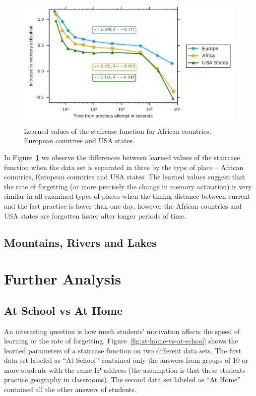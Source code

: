 \begin{figure}[htbp]
  \centering
  \includegraphics[width=\textwidth]{img/africa-europe-usa-states}
  \caption{Learned values of the staircase function for African countries, European countries and USA states.}
  \label{fig:africa-europe-usa-states}
\end{figure}

In Figure~\ref{fig:africa-europe-usa-states} we observe the differences between learned values of the staircase function when the data set is separated in three by the type of place -- African countries, European countries and USA states. The learned values suggest that the rate of forgetting (or more precisely the change in memory activation) is very similar in all examined types of places when the timing distance between current and the last practice is lower than one day, however the African countries and USA states are forgotten faster after longer periods of time.

\subsection{Mountains, Rivers and Lakes}

\section{Further Analysis}
\label{further-analysis}

\subsection{At School vs At Home}

An interesting question is how much students' motivation affects the speed of learning or the rate of forgetting. Figure~\ref{fig:at-home-vs-at-school} shows the learned parameters of a staircase function on two different data sets. The first data set labeled as ``At School'' contained only the answers from groups of 10 or more students with the same IP address (the assumption is that these students practice geography in classrooms). The second data set labeled as ``At Home'' contained all the other answers of students.

